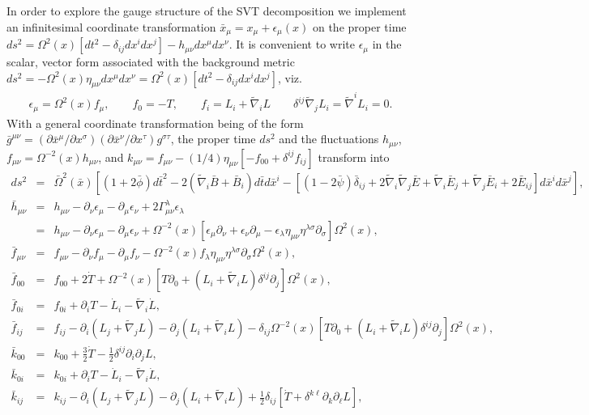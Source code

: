 \documentclass[aps]{revtex4}
\begin{document}
In order to explore the gauge structure of the SVT decomposition we implement an infinitesimal coordinate transformation $\bar{x}_{\mu}=x_{\mu}+\epsilon_{\mu}(x)$ on the proper time $ds^2=\Omega^2(x)[dt^2-\delta_{ij}dx^idx^j]-h_{\mu\nu}dx^{\mu}dx^{\nu}$. It is convenient to write $\epsilon_{\mu}$ in the scalar, vector form associated with the background metric $ds^2=-\Omega^2(x)\eta_{\mu\nu}dx^{\mu}dx^{\nu}=\Omega^2(x)[dt^2-\delta_{ij}dx^idx^j]$, viz.  
%
\begin{eqnarray}
\epsilon_{\mu}=\Omega^2(x)f_{\mu},\qquad f_{0}=-T,\qquad f_i=L_i+\tilde{\nabla}_iL\qquad \delta^{ij}\tilde{\nabla}_jL_i=\tilde{\nabla}^iL_i=0.
\label{AP67}
\end{eqnarray}
%
With a general coordinate transformation being of the form $\bar{g}^{\mu\nu}=(\partial \bar{x}^{\mu}/\partial x^{\sigma})(\partial \bar{x}^{\nu}/\partial x^{\tau})g^{\sigma\tau}$,  the proper time $ds^2$ and the fluctuations $h_{\mu\nu}$,  $f_{\mu\nu}=\Omega^{-2}(x)h_{\mu\nu}$, and $k_{\mu\nu}=f_{\mu\nu}-(1/4)\eta_{\mu\nu}[-f_{00}+\delta^{ij}f_{ij}]$ transform into 
%
\begin{eqnarray}
ds^2&=&\bar{\Omega}^2(\bar{x}) \left[ (1+2\bar{\phi}) d\bar{t}^2 -2(\tilde{\nabla}_i \bar{B} +\bar{B}_i)d\bar{t}d\bar{x}^i - [(1-2\bar{\psi})\bar{\delta}_{ij} +2\tilde{\nabla}_i\tilde{\nabla}_j \bar{E} + \tilde{\nabla}_i \bar{E}_j + \tilde{\nabla}_j \bar{E}_i + 2\bar{E}_{ij}]d\bar{x}^i d\bar{x}^j\right],
\nonumber\\
\bar{h}_{\mu\nu}&=&h_{\mu\nu}-\partial_{\nu}\epsilon_{\mu}-\partial_{\mu}\epsilon_{\nu}+2\Gamma^{\lambda}_{\mu\nu}\epsilon_{\lambda}
\nonumber\\
&=&h_{\mu\nu}-\partial_{\nu}\epsilon_{\mu}-\partial_{\mu}\epsilon_{\nu}+\Omega^{-2}(x)[\epsilon_{\mu}\partial_{\nu}+\epsilon_{\nu}\partial_{\mu}
-\epsilon_{\lambda}\eta_{\mu\nu}\eta^{\lambda\sigma}\partial_{\sigma}]\Omega^2(x),
\nonumber\\
\bar{f}_{\mu\nu}&=&f_{\mu\nu}-\partial_{\nu}f_{\mu}-\partial_{\mu}f_{\nu}-\Omega^{-2}(x)f_{\lambda}\eta_{\mu\nu}\eta^{\lambda\sigma}\partial_{\sigma}\Omega^2(x),
\nonumber\\
\bar{f}_{00}&=&f_{00}+2\dot{T}+\Omega^{-2}(x)[T\partial_0+(L_i+\tilde{\nabla}_iL)\delta^{ij}\partial_j]\Omega^2(x),
\nonumber\\
\bar{f}_{0i}&=&f_{0i}+\partial_iT-\dot{L}_i-\tilde{\nabla}_i\dot{L},
\nonumber\\
\bar{f}_{ij}&=&f_{ij}-\partial_{i}(L_j+\tilde{\nabla}_jL)-\partial_{j}(L_i+\tilde{\nabla}_iL)
-\delta_{ij}\Omega^{-2}(x)[T\partial_0+(L_i+\tilde{\nabla}_iL)\delta^{ij}\partial_j]\Omega^2(x),
\nonumber\\
\bar{k}_{00}&=&k_{00}+\frac{3}{2}\dot{T}-\frac{1}{2}\delta^{ij}\partial_i\partial_jL,
\nonumber\\
\bar{k}_{0i}&=&k_{0i}+\partial_iT-\dot{L}_i-\tilde{\nabla}_i\dot{L},
\nonumber\\
\bar{k}_{ij}&=&k_{ij}-\partial_{i}(L_j+\tilde{\nabla}_jL)-\partial_{j}(L_i+\tilde{\nabla}_iL)
+\frac{1}{2}\delta_{ij}[\dot{T}+\delta^{k\ell}\partial_k\partial_{\ell}L],
\label{AP68}
\end{eqnarray}
\end{document}
